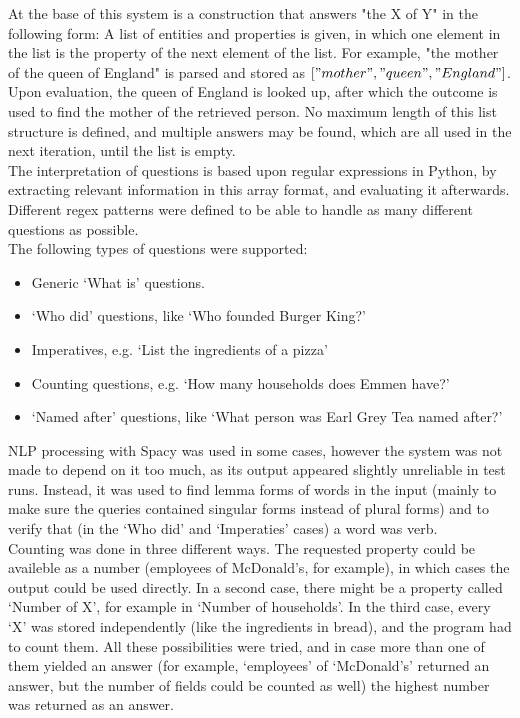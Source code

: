 \documentclass{article}
\begin{document}
At the base of this system is a construction that answers "the X of Y" in the following form: A list of entities and properties is given, in which one element in the list is the property of the next element of the list. For example, "the mother of the queen of England" is parsed and stored as $["mother", "queen", "England"]$. Upon evaluation, the queen of England is looked up, after which the outcome is used to find the mother of the retrieved person. No maximum length of this list structure is defined, and multiple answers may be found, which are all used in the next iteration, until the list is empty.\\

The interpretation of questions is based upon regular expressions in Python, by extracting relevant information in this array format, and evaluating it afterwards. Different regex patterns were defined to be able to handle as many different questions as possible.\\

The following types of questions were supported:\\

\begin{itemize}
	\item Generic `What is' questions.
	\item `Who did' questions, like `Who founded Burger King?'
	\item Imperatives, e.g. `List the ingredients of a pizza'
	\item Counting questions, e.g. `How many households does Emmen have?'
	\item `Named after' questions, like `What person was Earl Grey Tea named after?'
\end{itemize}

NLP processing with Spacy was used in some cases, however the system was not made to depend on it too much, as its output appeared slightly unreliable in test runs. Instead, it was used to find lemma forms of words in the input (mainly to make sure the queries contained singular forms instead of plural forms) and to verify that (in the `Who did' and `Imperaties' cases) a word was verb.\\

Counting was done in three different ways. The requested property could be availeble as a number (employees of McDonald's, for example), in which cases the output could be used directly. In a second case, there might be a property called `Number of X', for example in `Number of households'. In the third case, every `X' was stored independently (like the ingredients in bread), and the program had to count them. All these possibilities were tried, and in case more than one of them yielded an answer (for example, `employees' of `McDonald's' returned an answer, but the number of fields could be counted as well) the highest number was returned as an answer.\\
\end{document}
